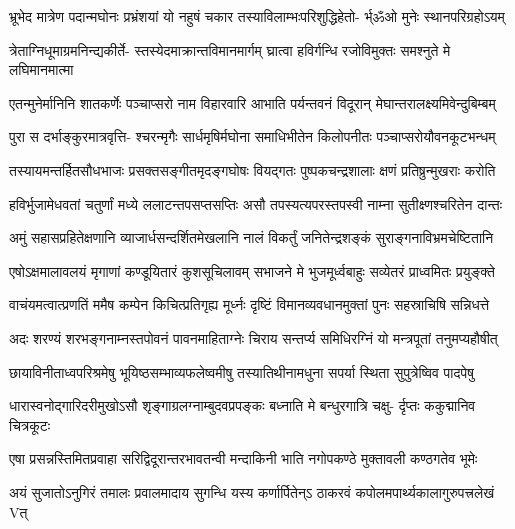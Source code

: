 \fourlineindentedshloka
{भ्रूभेद मात्रेण पदान्मघोनः}
{प्रभ्रंशयां यो नहुषं चकार}
{तस्याविलाम्भःपरिशुद्धिहेतो-}
{र्भ्ॐओ मुनेः स्थानपरिग्रहोऽयम्} %

\fourlineindentedshloka
{त्रेताग्निधूमाग्रमनिन्द्यकीर्ते-}
{स्तस्येदमाक्रान्तविमानमार्गम्}
{घ्रात्वा हविर्गन्धि रजोविमुक्तः}
{समश्नुते मे लघिमानमात्मा} %

\fourlineindentedshloka
{एतन्मुनेर्मानिनि शातकर्णेः}
{पञ्चाप्सरो नाम विहारवारि}
{आभाति पर्यन्तवनं विदूरान्}
{मेघान्तरालक्ष्यमिवेन्दुबिम्बम्} %

\fourlineindentedshloka
{पुरा स दर्भाङ्कुरमात्रवृत्ति-}
{श्चरन्मृगैः सार्धमृषिर्मघोना}
{समाधिभीतेन किलोपनीतः}
{पञ्चाप्सरोयौवनकूटभन्धम्} %

\fourlineindentedshloka
{तस्यायमन्तर्हितसौधभाजः}
{प्रसक्तसङ्गीतमृदङ्गघोषः}
{वियद्गतः पुष्पकचन्द्रशालाः}
{क्षणं प्रतिष्रुन्मुखराः करोति} %

\fourlineindentedshloka
{हविर्भुजामेधवतां चतुर्णां}
{मध्ये ललाटन्तपसप्तसप्तिः}
{असौ तपस्यत्यपरस्तपस्वी}
{नाम्ना सुतीक्ष्णश्चरितेन दान्तः} %

\fourlineindentedshloka
{अमुं सहासप्रहितेक्षणानि}
{व्याजार्धसन्दर्शितमेखलानि}
{नालं विकर्तुं जनितेन्द्रशङ्कं}
{सुराङ्गनाविभ्रमचेष्टितानि} %

\fourlineindentedshloka
{एषोऽक्षमालावलयं मृगाणां}
{कण्डूयितारं कुशसूचिलावम्}
{सभाजने मे भुजमूर्ध्वबाहुः}
{सव्येतरं प्राध्वमितः प्रयुङ्क्ते} %

\fourlineindentedshloka
{वाचंयमत्वात्प्रणतिं ममैष}
{कम्पेन किचित्प्रतिगृह्य मूर्ध्नः}
{दृष्टिं विमानव्यवधानमुक्तां}
{पुनः सहस्राचिषि सन्निधत्ते} %

\twolineshloka
{अदः शरण्यं शरभङ्गनाम्नस्तपोवनं पावनमाहिताग्नेः}
{चिराय सन्तर्प्य समिधिरग्निं यो मन्त्रपूतां तनुमप्यहौषीत्} %

\fourlineindentedshloka
{छायाविनीताध्वपरिश्रमेषु}
{भूयिष्ठसम्भाव्यफलेष्वमीषु}
{तस्यातिथीनामधुना सपर्या}
{स्थिता सुपुत्रेष्विव पादपेषु} %

\fourlineindentedshloka
{धारास्वनोद्गारिदरीमुखोऽसौ}
{शृङ्गाग्रलग्नाम्बुदवप्रपङ्कः}
{बध्नाति मे बन्धुरगात्रि चक्षु-}
{र्दृप्तः ककुद्मानिव चित्रकूटः} %

\fourlineindentedshloka
{एषा प्रसन्नस्तिमितप्रवाहा}
{सरिद्विदूरान्तरभावतन्वी}
{मन्दाकिनी भाति नगोपकण्ठे}
{मुक्तावली कण्ठगतेव भूमेः} %

\twolineshloka
{अयं सुजातोऽनुगिरं तमालः प्रवालमादाय सुगन्धि यस्य}
{कर्णार्पितेन्ऽ ठाकरवं कपोलमपार्थ्यकालागुरुपत्त्रलेखं Vत्} %

